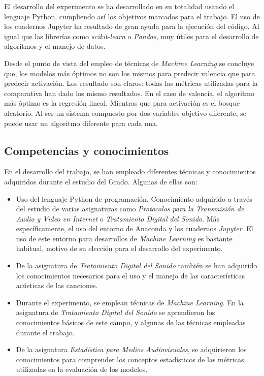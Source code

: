 \documentclass[12pt,a4paper,Spanish]{article}
\begin{document}
El desarrollo del experimento se ha desarrollado en su totalidad usando el lenguaje Python, cumpliendo así los objetivos marcados para el trabajo. El uso de los cuadernos Jupyter ha resultado de gran ayuda para la ejecución del código. Al igual que las librerías como \textit{scikit-learn} o \textit{Pandas}, muy útiles para el desarrollo de algoritmos y el manejo de datos.
\newline

Desde el punto de vista del empleo de técnicas de \textit{Machine Learning} se concluye que, los modelos más óptimos no son los mismos para predecir valencia que para predecir activación. Los resultado son claros: todas las métricas utilizadas para la comparativa han dado los mismo resultados. En el caso de valencia, el algoritmo más óptimo es la regresión lineal. Mientras que para activación es el bosque aleatorio.  Al ser un sistema compuesto por dos variables objetivo diferente, se puede usar un algoritmo diferente para cada una.




\subsection{Competencias y conocimientos}
En el desarrollo del trabajo, se han empleado diferentes técnicas y conocimientos adquiridos durante el estudio del Grado. Algunas de ellas son:
\begin{itemize}
	\item Uso del lenguaje Python de programación. Conocimiento adquirido a través del estudio de varias asignaturas como \textit{Protocolos para la Transmisión de Audio y Video en Internet} o \textit{Tratamiento Digital del Sonido}. Más específicamente, el uso del entorno de Anaconda y los cuadernos \textit{Jupyter}. El uso de este entorno para desarrollos de \textit{Machine Learning} es bastante habitual, motivo de su elección para el desarrollo del experimento.
	\item De la asignatura de \textit{Tratamiento Digital del Sonido} también se han adquirido los conocimientos necesarios para el uso y el manejo de las características acústicas de las canciones.
	\item Durante el experimento, se emplean técnicas de \textit{Machine Learning}. En la asignatura de \textit{Tratamiento Digital del Sonido} se aprendieron los conocimientos básicos de este campo, y algunas de las técnicas empleadas durante el trabajo.
	\item De la asignatura \textit{Estadística para Medios Audiovisuales}, se adquirieron los conocimientos para comprender los conceptos estadísticos de las métricas utilizadas en la evaluación de los modelos.
\end{itemize}
\end{document}
